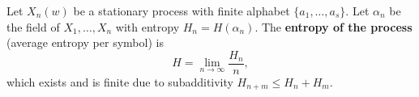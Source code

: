 Let $X_n(w)$ be a stationary process with finite alphabet $\{a_1, \ldots, a_s\}$. Let $\alpha_n$ be the field of $X_1, \ldots, X_n$ with entropy $H_n = H(\alpha_n)$. The \textbf{entropy of the process} (average entropy per symbol) is
$$H = \lim_{n \to \infty} \frac{H_n}{n},$$
which exists and is finite due to subadditivity $H_{n+m} \leq H_n + H_m$.
